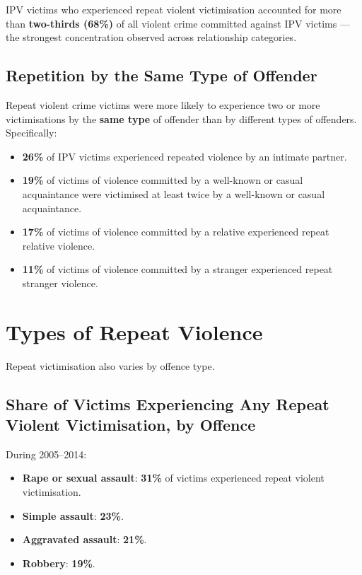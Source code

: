 \documentclass[11pt,a4paper,openany]{report}
\theoremstyle{definition}
\theoremstyle{plain}
\theoremstyle{remark}
\begin{document}
IPV victims who experienced repeat violent victimisation accounted for more than \textbf{two-thirds (68\%)} of all violent crime committed against IPV victims --- the strongest concentration observed across relationship categories.

\subsection{Repetition by the Same Type of Offender}

Repeat violent crime victims were more likely to experience two or more victimisations by the \textbf{same type} of offender than by different types of offenders. Specifically:

\begin{itemize}
    \item \textbf{26\%} of IPV victims experienced repeated violence by an intimate partner.
    \item \textbf{19\%} of victims of violence committed by a well-known or casual acquaintance were victimised at least twice by a well-known or casual acquaintance.
    \item \textbf{17\%} of victims of violence committed by a relative experienced repeat relative violence.
    \item \textbf{11\%} of victims of violence committed by a stranger experienced repeat stranger violence.
\end{itemize}

\section{Types of Repeat Violence}

Repeat victimisation also varies by offence type.

\subsection{Share of Victims Experiencing Any Repeat Violent Victimisation, by Offence}

During 2005--2014:

\begin{itemize}
    \item \textbf{Rape or sexual assault}: \textbf{31\%} of victims experienced repeat violent victimisation.
    \item \textbf{Simple assault}: \textbf{23\%}.
    \item \textbf{Aggravated assault}: \textbf{21\%}.
    \item \textbf{Robbery}: \textbf{19\%}.
\end{itemize}
\end{document}
